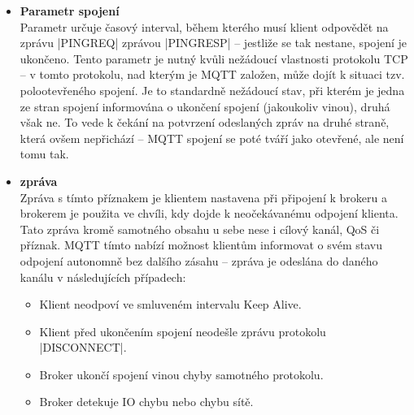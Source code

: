 \begin{itemize}
    \item \textbf{Parametr spojení } \\
    Parametr  určuje časový interval, během kterého musí klient odpovědět na zprávu \ic|PINGREQ| zprávou
    \ic|PINGRESP| -- jestliže se tak nestane, spojení je ukončeno.
    Tento parametr je nutný kvůli nežádoucí vlastnosti protokolu TCP --
    v tomto protokolu, nad kterým je MQTT založen, může dojít k situaci tzv. polootevřeného spojení.
    Je to standardně nežádoucí stav, při kterém je jedna ze stran spojení informována o ukončení spojení (jakoukoliv
    vinou), druhá však ne.
    To vede k čekání na potvrzení odeslaných zpráv na druhé straně, která ovšem nepřichází -- MQTT spojení se poté
    tváří jako otevřené, ale není tomu tak.

    \item \textbf{ zpráva} \\
    Zpráva s tímto příznakem je klientem nastavena při připojení k brokeru a brokerem je použita ve chvíli, kdy dojde
    k neočekávanému odpojení klienta.
    Tato zpráva  kromě samotného obsahu u sebe nese i cílový kanál, QoS či 
    příznak.
    MQTT tímto nabízí možnost klientům informovat o svém stavu odpojení autonomně bez dalšího zásahu --
     zpráva je odeslána do daného kanálu v následujících případech:
    \begin{itemize}
        \item Klient neodpoví ve smluveném intervalu Keep Alive.
        \item Klient před ukončením spojení neodešle zprávu protokolu \ic|DISCONNECT|.
        \item Broker ukončí spojení vinou chyby samotného protokolu.
        \item Broker detekuje IO chybu nebo chybu sítě.
    \end{itemize}
\end{itemize}

